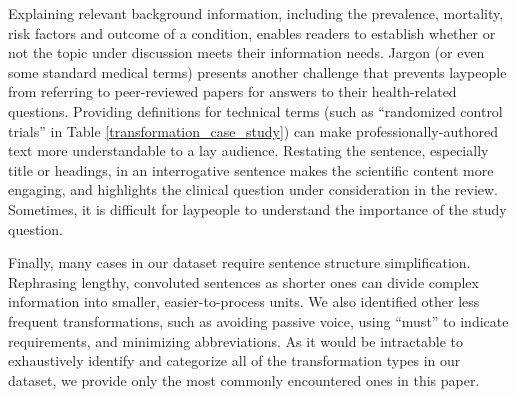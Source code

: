 \documentclass[letterpaper, table]{article} %
\newcommand{\draftonly}[1]{#1}
\newcommand{\draftcomment}[3]{\draftonly{\textcolor{#2}{[#3]{$_{\textsc{\tiny #1}}$}}}}
\newcommand{\yizhong}[1]{\draftcomment{Yizhong}{blue}{#1}}
\begin{document}
Explaining relevant background information, including the prevalence, mortality, risk factors and outcome of a condition, enables readers to establish whether or not the topic under discussion meets their information needs. Jargon (or even some standard medical terms) presents another challenge that prevents laypeople from referring to peer-reviewed papers for answers to their health-related questions. Providing definitions for technical terms (such as ``randomized control trials'' in Table \ref{transformation_case_study}) can make professionally-authored text more understandable to a lay audience. Restating the sentence, especially title or headings, in an interrogative sentence makes the scientific content more engaging, and highlights the clinical question under consideration in the review. Sometimes, it is difficult for laypeople to understand the importance of the study question. 

Finally, many cases in our dataset require sentence structure simplification. Rephrasing lengthy, convoluted sentences as shorter ones can divide complex information into smaller, easier-to-process units. We also identified other less frequent transformations, such as avoiding passive voice, using ``must'' to indicate requirements, and minimizing abbreviations. As it would be intractable to exhaustively identify and categorize all of the transformation types in our dataset, we provide only the most commonly encountered ones in this paper.



\end{document}
